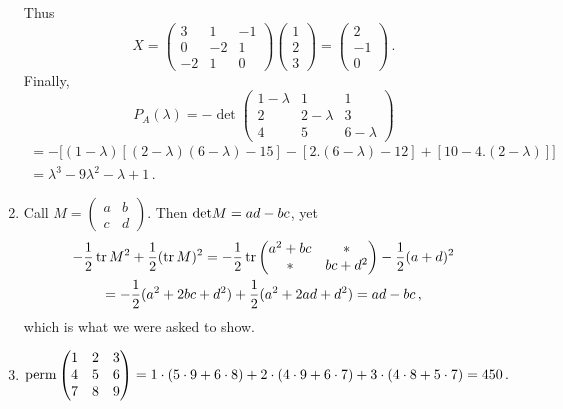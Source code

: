 \begin{enumerate}
Thus
\[
X=\begin{pmatrix}3&1& -1\\ 0&-2& 1 \\-2&1 & 0 \end{pmatrix}
\begin{pmatrix}1\\2\\3
\end{pmatrix}=
\begin{pmatrix}2\\-1\\0
\end{pmatrix}\, .
\]
Finally, 
\[
P_A(\lambda)=-\det \begin{pmatrix}1-\lambda&1&1\\2&2-\lambda&3\\4&5&6-\lambda\end{pmatrix}\]
\begin{gather*}
=-\Big[(1-\lambda)[(2-\lambda)(6-\lambda)-15]-[2.(6-\lambda)-12]+[10-4.(2-\lambda)]\Big]
\\
=\lambda^3-9\lambda^2-\lambda+1\, .
\end{gather*}
\item
Call $M=\begin{pmatrix}a&b\\c&d\end{pmatrix}$. Then ${\rm det} M= ad-bc$, yet
\begin{gather*}
-\frac 12 \operatorname{tr} M^2 + \frac12 (\operatorname{tr} M)^2 = -\frac 12 \operatorname{tr} \begin{pmatrix}a^2 + bc & * \\ * & bc + d^2\end{pmatrix} -\frac12 (a+d)^2\\ 
=-\frac 12 (a^2 + 2bc + d^2) + \frac 12 (a^2 + 2ad + d^2) = ad - bc\, ,
\end{gather*}
which is what we were asked to show.

\item 

\[
{\rm perm} \begin{pmatrix}1 & 2 & 3 \\ 4 & 5 & 6 \\ 7 & 8 & 9\end{pmatrix}
=1\cdot(5\cdot9+6\cdot8)+2\cdot(4\cdot9+6\cdot7)+3\cdot(4\cdot8+5\cdot7)=450\, .
\]


\end{enumerate}
